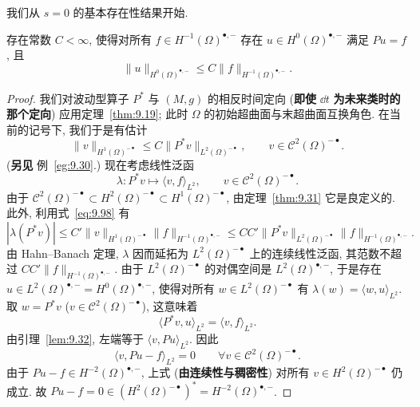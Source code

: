 我们从 $s = 0$ 的基本存在性结果开始.

\begin{lemma}[存在性: $s = 0$]\label{lem:9.34}
存在常数 $C < \infty$, 使得对所有 $f \in H^{-1}(\Omega)^{\bullet,-}$ 存在 $u \in H^0(\Omega)^{\bullet,-}$ 满足 $P u = f$, 且
\begin{equation}\label{eq:9.97}
    \|u\|_{H^0(\Omega)^{\bullet,-}} \le C \|f\|_{H^{-1}(\Omega)^{\bullet,-}}.
\end{equation}
\end{lemma}

\begin{proof}
我们对波动型算子 $P^*$ 与 $(M, g)$ 的相反时间定向 (\textbf{即使} $\dd t$ \textbf{为未来类时的那个定向}) 应用定理~\ref{thm:9.19}; 此时 $\Omega$ 的初始超曲面与末超曲面互换角色. 在当前的记号下, 我们于是有估计
\begin{equation}\label{eq:9.98}
    \|v\|_{H^1(\Omega)^{- \bullet}} \le C \|P^* v\|_{L^2(\Omega)^{- \bullet}}, \qquad v \in \mathcal{C}^2(\Omega)^{- \bullet}.
\end{equation}
(\textbf{另见} 例~\ref{eg:9.30}.) 现在考虑线性泛函
\begin{equation}\label{eq:9.99}
    \lambda \colon P^* v \mapsto \langle v, f \rangle_{L^2}, \qquad v \in \mathcal{C}^2(\Omega)^{- \bullet}.
\end{equation}
由于 $\mathcal{C}^2(\Omega)^{- \bullet} \subset H^2(\Omega)^{- \bullet} \subset H^1(\Omega)^{- \bullet}$, 由定理~\ref{thm:9.31} 它是良定义的. 此外, 利用式~\eqref{eq:9.98} 有
\begin{equation}\label{eq:9.100}
    |\lambda(P^* v)| \le C' \|v\|_{H^1(\Omega)^{- \bullet}} \|f\|_{H^{-1}(\Omega)^{\bullet,-}} \le CC' \|P^* v\|_{L^2(\Omega)^{- \bullet}} \|f\|_{H^{-1}(\Omega)^{\bullet,-}}.
\end{equation}
由 Hahn--Banach 定理, $\lambda$ 因而延拓为 $L^2(\Omega)^{- \bullet}$ 上的连续线性泛函, 其范数不超过 $CC' \|f\|_{H^{-1}(\Omega)^{\bullet,-}}$. 由于 $L^2(\Omega)^{- \bullet}$ 的对偶空间是 $L^2(\Omega)^{\bullet,-}$, 于是存在 $u \in L^2(\Omega)^{\bullet,-} = H^0(\Omega)^{\bullet,-}$, 使得对所有 $w \in L^2(\Omega)^{- \bullet}$ 有 $\lambda(w) = \langle w, u \rangle_{L^2}$. 取 $w = P^* v$ ($v \in \mathcal{C}^2(\Omega)^{- \bullet}$), 这意味着
\begin{equation}\label{eq:9.101}
    \langle P^* v, u \rangle_{L^2} = \langle v, f \rangle_{L^2}.
\end{equation}
由引理~\ref{lem:9.32}, 左端等于 $\langle v, P u \rangle_{L^2}$. 因此
\begin{equation}\label{eq:9.102}
    \langle v, P u - f \rangle_{L^2} = 0 \qquad \forall v \in \mathcal{C}^2(\Omega)^{- \bullet}.
\end{equation}
由于 $P u - f \in H^{-2}(\Omega)^{\bullet,-}$, 上式 (\textbf{由连续性与稠密性}) 对所有 $v \in H^2(\Omega)^{- \bullet}$ 仍成立. 故 $P u - f = 0 \in (H^2(\Omega)^{- \bullet})^* = H^{-2}(\Omega)^{\bullet,-}$.
\end{proof}

